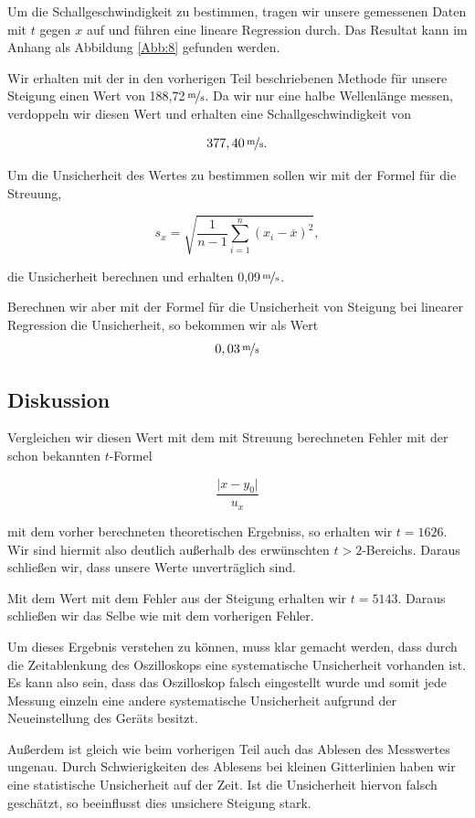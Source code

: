 \documentclass[11pt,a4paper]{article}
\begin{document}
Um die Schallgeschwindigkeit zu bestimmen, tragen wir unsere gemessenen Daten mit $t$ gegen $x$ auf und f\"uhren eine lineare Regression durch.  Das Resultat kann im Anhang als Abbildung \ref{Abb:8} gefunden werden.

Wir erhalten mit der in den vorherigen Teil beschriebenen Methode f\"ur unsere Steigung einen Wert von 188,72\,$\nicefrac{\mathrm{m}}{\mathrm{s}}$. Da wir nur eine halbe Wellenl\"ange messen, verdoppeln wir diesen Wert und erhalten eine Schallgeschwindigkeit von 

\[
377,40\,\nicefrac{\mathrm{m}}{\mathrm{s}}.
\]

Um die Unsicherheit des Wertes zu bestimmen sollen wir mit der Formel f\"ur die Streuung,

\[s_x=\sqrt{\frac{1}{n-1}\sum_{i=1}^n(x_i-\overline{x})^2},\]

 die Unsicherheit berechnen und erhalten 0,09\,$\nicefrac{\mathrm{m}}{\mathrm{s}}$.

Berechnen wir aber mit der Formel f\"ur die Unsicherheit von Steigung bei linearer Regression die Unsicherheit, so bekommen wir als Wert
\[
0,03\,\nicefrac{\mathrm{m}}{\mathrm{s}}
\]

\subsection{Diskussion}

Vergleichen wir diesen Wert mit dem mit Streuung berechneten Fehler mit der schon bekannten $t$-Formel

\[\frac{\vert x-y_0\vert}{u_x}\]

mit dem vorher berechneten theoretischen Ergebniss, so erhalten wir $t=1626$. Wir sind hiermit also deutlich au\ss erhalb des erw\"unschten $t>2$-Bereichs. Daraus schlie\ss en wir, dass unsere Werte unvertr\"aglich sind.

Mit dem Wert mit dem Fehler aus der Steigung erhalten wir $t=5143$. Daraus schlie\ss en wir das Selbe wie mit dem vorherigen Fehler.

Um dieses Ergebnis verstehen zu k\"onnen, muss klar gemacht werden, dass durch die Zeitablenkung des Oszilloskops eine systematische Unsicherheit vorhanden ist. Es kann also sein, dass das Oszilloskop falsch eingestellt wurde und somit jede Messung einzeln eine andere systematische Unsicherheit aufgrund der Neueinstellung des Ger\"ats besitzt.

Au\ss erdem ist gleich wie beim vorherigen Teil auch das Ablesen des Messwertes ungenau. Durch Schwierigkeiten des Ablesens bei kleinen Gitterlinien haben wir eine statistische Unsicherheit auf der Zeit. Ist die Unsicherheit hiervon falsch gesch\"atzt, so beeinflusst dies unsichere Steigung stark.
\end{document}
